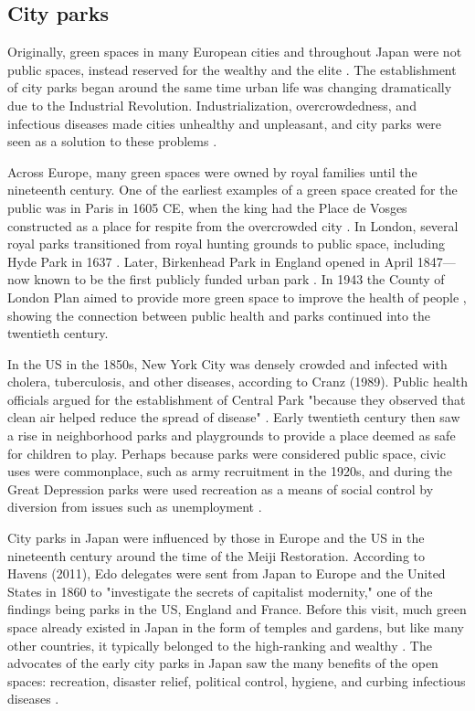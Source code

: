 \begin{multicols}{2}

\section{City parks} 
Originally, green spaces in many European cities and throughout Japan were not public spaces, instead reserved for the wealthy and the elite \cite{havens_parkscapes_2011}\cite{jones_equity_2009}. The establishment of city parks began around the same time urban life was changing dramatically due to the Industrial Revolution. Industrialization, overcrowdedness, and infectious diseases made cities unhealthy and unpleasant, and city parks were seen as a solution to these problems \cite{malchow_public_1985}\cite{jones_lungs_2018}. 

Across Europe, many green spaces were owned by royal families until the nineteenth century. One of the earliest examples of a green space created for the public was in Paris in 1605 CE, when the king had the Place de Vosges constructed as a place for respite from the overcrowded city \cite{jones_lungs_2018}. In London, several royal parks transitioned from royal hunting grounds to public space, including Hyde Park in 1637 \cite{jones_lungs_2018}. Later, Birkenhead Park in England opened in April 1847---now known to be the first publicly funded urban park \cite{tate_great_2013}. In 1943 the County of London Plan aimed to provide more green space to improve the health of people \cite{hill_forshaw_2005}, showing the connection between public health and parks continued into the twentieth century.

In the US in the 1850s, New York City was densely crowded and infected with cholera, tuberculosis, and other diseases, according to Cranz (1989). Public health officials argued for the establishment of Central Park "because they observed that clean air helped reduce the spread of disease" \cite{cranz_politics_1989}. Early twentieth century then saw a rise in neighborhood parks and playgrounds to provide a place deemed as safe for children to play. Perhaps because parks were considered public space, civic uses were commonplace, such as army recruitment in the 1920s, and during the Great Depression parks were used recreation as a means of social control by diversion from issues such as unemployment \cite{cranz_politics_1989}.

City parks in Japan were influenced by those in Europe and the US in the nineteenth century around the time of the Meiji Restoration. According to Havens (2011), Edo delegates were sent from Japan to Europe and the United States in 1860 to "investigate the secrets of capitalist modernity," one of the findings being parks in the US, England and France. Before this visit, much green space already existed in Japan in the form of temples and gardens, but like many other countries, it typically belonged to the high-ranking and wealthy \cite{havens_parkscapes_2011}. The advocates of the early city parks in Japan saw the many benefits of the open spaces: recreation, disaster relief, political control, hygiene, and curbing infectious diseases \cite{havens_parkscapes_2011}. 


\end{multicols}
